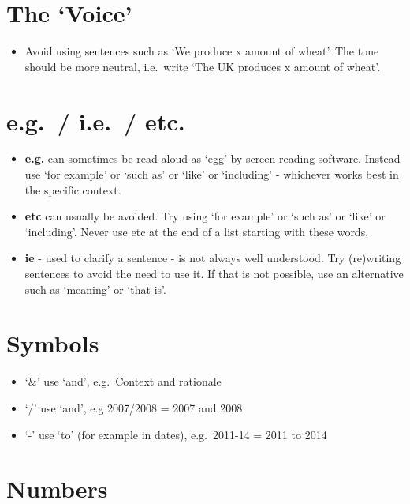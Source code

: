 \documentclass[
]{book}
\providecommand{\tightlist}{%
  \setlength{\itemsep}{0pt}\setlength{\parskip}{0pt}}
\begin{document}
\hypertarget{the-voice}{%
\section{The `Voice'}\label{the-voice}}

\begin{itemize}
\tightlist
\item
  Avoid using sentences such as `We produce x amount of wheat'. The tone should be more neutral, i.e.~write `The UK produces x amount of wheat'.
\end{itemize}

\hypertarget{e.g.-i.e.-etc.}{%
\section{e.g.~/ i.e.~/ etc.}\label{e.g.-i.e.-etc.}}

\begin{itemize}
\tightlist
\item
  \textbf{e.g.} can sometimes be read aloud as `egg' by screen reading software. Instead use `for example' or `such as' or `like' or `including' - whichever works best in the specific context.
\item
  \textbf{etc} can usually be avoided. Try using `for example' or `such as' or `like' or `including'. Never use etc at the end of a list starting with these words.
\item
  \textbf{ie} - used to clarify a sentence - is not always well understood. Try (re)writing sentences to avoid the need to use it. If that is not possible, use an alternative such as `meaning' or `that is'.
\end{itemize}

\hypertarget{symbols}{%
\section{Symbols}\label{symbols}}

\begin{itemize}
\tightlist
\item
  `\&' use `and', e.g.~Context and rationale
\item
  `/' use `and', e.g 2007/2008 = 2007 and 2008
\item
  `-' use `to' (for example in dates), e.g.~2011-14 = 2011 to 2014
\end{itemize}

\hypertarget{numbers}{%
\section{Numbers}\label{numbers}}
\end{document}
